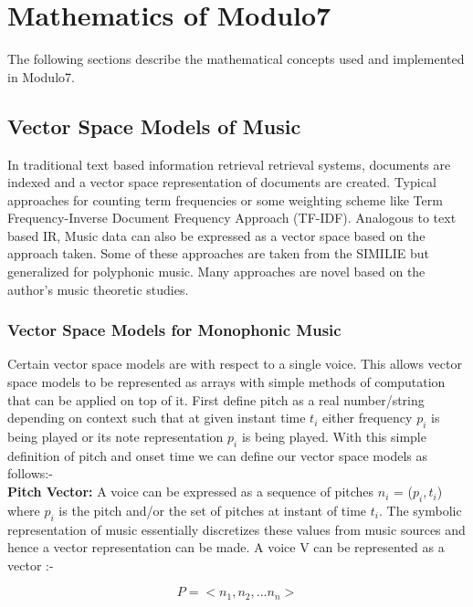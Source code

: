 \chapter{Mathematics of Modulo7}
\label{sec:mir math}

\noindent The following sections describe the mathematical concepts used and implemented in Modulo7.

\section{Vector Space Models of Music}

\noindent In traditional text based information retrieval retrieval systems, documents are indexed and a vector space representation of documents are created. Typical approaches for counting term frequencies or some weighting scheme like Term Frequency-Inverse Document Frequency Approach (TF-IDF). Analogous to text based IR, Music data can also be expressed as a vector space based on the approach taken. Some of these approaches are taken from the SIMILIE \cite{similietechnicalmanual} but generalized for polyphonic music. Many approaches are novel based on the author's music theoretic studies. 

\subsection{Vector Space Models for Monophonic Music}

\noindent Certain vector space models are with respect to a single voice. This allows vector space models to be represented as arrays with simple methods of computation that can be applied on top of it. First define pitch as a real number/string depending on context such that at given instant time $t_i$ either frequency $p_i$ is being played or its note representation $p_i$ is being played. With this simple definition of pitch and onset time we can define our vector space models as follows:-\\
 
\noindent \textbf{Pitch Vector:} A voice can be expressed as a sequence of pitches $n_i$ = ($p_i, t_i$) where $p_i$ is the pitch and/or the set of pitches at instant of time $t_i$. The symbolic representation of music essentially discretizes these values from music sources and hence a vector representation can be made. A voice V can be represented as a vector :-

\begin{equation}
P = <n_1, n_2, ... n_n>
\end{equation}

